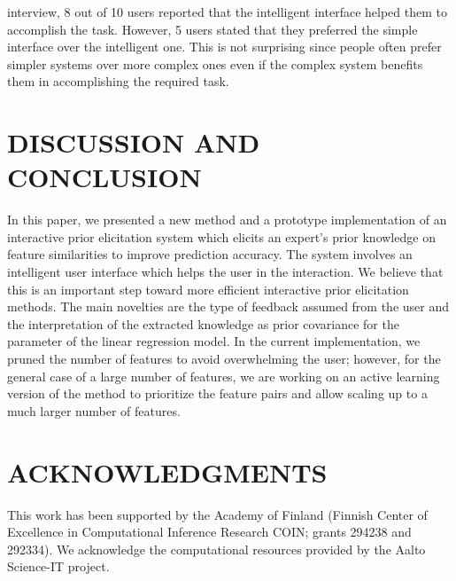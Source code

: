 \documentclass{sig-alternate}
\begin{document}
interview, 8 out of 10 users reported that the intelligent interface
helped them to accomplish the task. However, 5 users stated that
they preferred the simple interface over the intelligent one. This
is not surprising since people often prefer simpler systems over
more complex ones \cite{Hearst:2009:SUI:1631268} even if the complex system benefits them
in accomplishing the required task.

\section{DISCUSSION AND CONCLUSION}

In this paper, we presented a new method and a prototype implementation
of an interactive prior elicitation system which elicits
an expert's prior knowledge on feature similarities to improve prediction
accuracy. The system involves an intelligent user interface
which helps the user in the interaction. We believe that this is an
important step toward more efficient interactive prior elicitation
methods. The main novelties are the type of feedback assumed from
the user and the interpretation of the extracted knowledge as prior
covariance for the parameter of the linear regression model.
In the current implementation, we pruned the number of features
to avoid overwhelming the user; however, for the general case of
a large number of features, we are working on an active learning
version of the method to prioritize the feature pairs and allow
scaling up to a much larger number of features.

\section{ACKNOWLEDGMENTS}

This work has been supported by the Academy of Finland (Finnish
Center of Excellence in Computational Inference Research COIN;
grants 294238 and 292334). We acknowledge the computational
resources provided by the Aalto Science-IT project.






\balancecolumns
\end{document}
